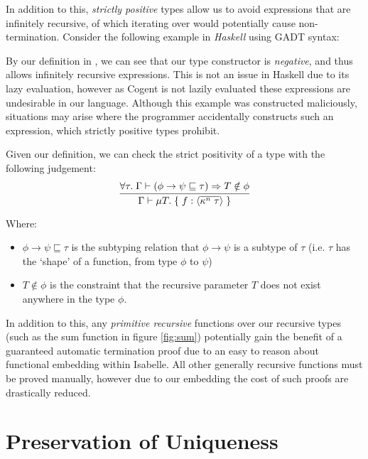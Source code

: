 In addition to this, \textit{strictly positive} types allow us to avoid expressions that are infinitely recursive,
of which iterating over  would potentially cause non-termination. Consider
the following example in \textit{Haskell} using GADT syntax:

\pagebreak



By our definition in , we can see that our type constructor is \textit{negative}, and
thus allows infinitely recursive expressions. This is not an issue in Haskell due to its lazy evaluation,
however as Cogent is not lazily evaluated these expressions are undesirable in our language. 
Although this example was constructed maliciously, situations may arise where the
programmer accidentally constructs such an expression, which strictly positive types prohibit.

Given our definition, we can check the strict positivity of a type with the following judgement:
$$
\infer{
    \Gamma \vdash \mu T.\; \{\; f: \langle \overline{\kappa^n\; \tau} \rangle\; \}
}{
   \forall \tau.\; \Gamma \vdash (\phi \rightarrow \psi \sqsubseteq \tau) \implies T \notin \phi
}
$$

Where:
\begin{itemize}
    \item 
        $\phi \rightarrow \psi \sqsubseteq \tau$ is the subtyping relation that $\phi \rightarrow \psi$
        is a subtype of $\tau$ (i.e. $\tau$ has the `shape' of a function, from type $\phi$ to $\psi$) 
    \item
        $T \notin \phi$ is the constraint that the recursive parameter $T$ does not exist anywhere in the type $\phi$.
\end{itemize}

In addition to this, any \textit{primitive recursive} functions over our recursive types 
(such as the sum function in figure \ref{fig:sum}) potentially gain the benefit of a guaranteed
automatic termination proof due to an easy to reason about functional embedding within Isabelle.
All other generally recursive functions must be proved manually, however due to our embedding
the cost of such proofs are drastically reduced.

\section{Preservation of Uniqueness}

